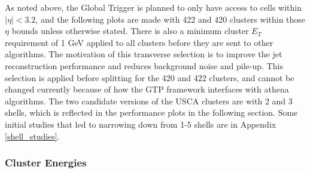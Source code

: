 \begin{table}[h!]
\centering
\caption{Physics simulated samples used for topocluster studies}
\label{samples}
\end{table}

As noted above, the Global Trigger is planned to only have access to cells within $\lvert \eta \rvert < 3.2 $, and the following plots are made with 422 and 420 clusters within those $\eta$ bounds unless otherwise stated.
There is also a minimum cluster $E_T$ requirement of 1 GeV applied to all clusters before they are sent to other algorithms.
The motivation of this transverse selection is to improve the jet reconstruction performance and reduces background noise and pile-up.  
This selection is applied before splitting for the 420 and 422 clusters, and cannot be changed currently because of how the GTP framework interfaces with {\selectfont athena} algorithms.
The two candidate versions of the USCA clusters are with 2 and 3 shells, which is reflected in the performance plots in the following section. 
Some initial studies that led to narrowing down from 1-5 shells are in Appendix \ref{shell_studies}.

\subsubsection{Cluster Energies}


